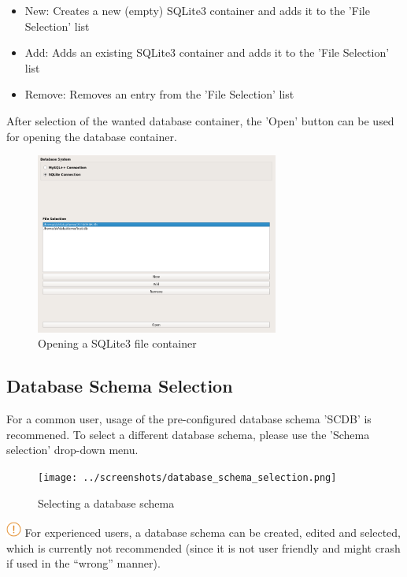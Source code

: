 \begin{itemize}  
\item New: Creates a new (empty) SQLite3 container and adds it to the 'File Selection' list
\item Add: Adds an existing  SQLite3 container and adds it to the 'File Selection' list
\item Remove: Removes an entry from the 'File Selection' list
\end{itemize}

After selection of the wanted database container, the 'Open' button can be used for opening the database container.

\begin{figure}[H]
  \center
    \includegraphics[width=8cm,frame]{../screenshots/sqlite3_open.png}
  \caption{Opening a SQLite3 file container}
  \label{fig:sqlite3_open}
\end{figure}

\subsection{Database Schema Selection}
For a common user, usage of the pre-configured database schema 'SCDB' is recommened. To select a different database schema, please use the 'Schema selection' drop-down menu.\\

\begin{figure}[H]
  \center
    \texttt{[image: ../screenshots/database\_schema\_selection.png]}
  \caption{Selecting a database schema}
  \label{fig:db_schema_select}
\end{figure}

\includegraphics[width=0.5cm]{../../data/icons/hint.png} For experienced users, a database schema can be created, edited and selected, which is currently not recommended (since it is not user friendly and might crash if used in the ``wrong'' manner).

